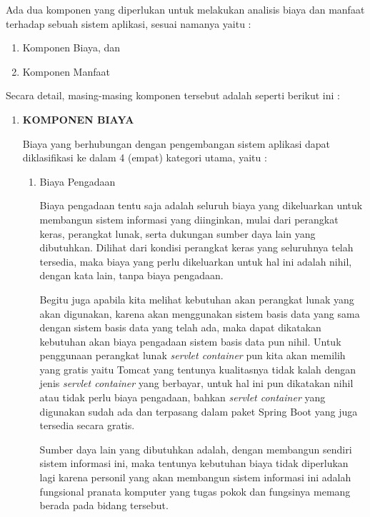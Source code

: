 \documentclass[pdftex,12pt, oneside]{article}
\begin{document}
Ada dua komponen yang diperlukan untuk melakukan analisis biaya dan manfaat terhadap sebuah sistem aplikasi, sesuai namanya yaitu :

\begin{enumerate}
	\item Komponen Biaya, dan
	\item Komponen Manfaat
\end{enumerate}

Secara detail, masing-masing komponen tersebut adalah seperti berikut ini :

\begin{enumerate}
	\item \textbf{KOMPONEN BIAYA}
	
Biaya yang berhubungan dengan pengembangan sistem aplikasi dapat diklasifikasi ke dalam 4 (empat) kategori utama, yaitu :

\begin{enumerate}
	\item Biaya Pengadaan
	
Biaya pengadaan tentu saja adalah seluruh biaya yang dikeluarkan untuk membangun sistem informasi yang diinginkan, mulai dari perangkat keras, perangkat lunak, serta dukungan sumber daya lain yang dibutuhkan. Dilihat dari kondisi perangkat keras yang seluruhnya telah tersedia, maka biaya yang perlu dikeluarkan untuk hal ini adalah nihil, dengan kata lain, tanpa biaya pengadaan.

Begitu juga apabila kita melihat kebutuhan akan perangkat lunak yang akan digunakan, karena akan menggunakan sistem basis data yang sama dengan sistem basis data yang telah ada, maka dapat dikatakan kebutuhan akan biaya pengadaan sistem basis data pun nihil. Untuk penggunaan perangkat lunak \textit{servlet container} pun kita akan memilih yang gratis yaitu Tomcat yang tentunya kualitasnya tidak kalah dengan jenis \textit{servlet container} yang berbayar, untuk hal ini pun dikatakan nihil atau tidak perlu biaya pengadaan, bahkan \textit{servlet container} yang digunakan sudah ada dan terpasang dalam paket Spring Boot yang juga tersedia secara gratis.

Sumber daya lain yang dibutuhkan adalah, dengan membangun sendiri sistem informasi ini, maka tentunya kebutuhan biaya tidak diperlukan lagi karena personil yang akan membangun sistem informasi ini adalah fungsional pranata komputer yang tugas pokok dan fungsinya memang berada pada bidang tersebut.


\end{enumerate}
\end{enumerate}
\end{document}
